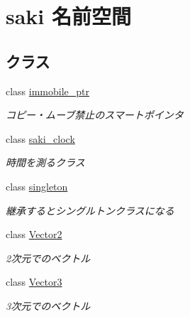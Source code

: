 \hypertarget{namespacesaki}{}\section{saki 名前空間}
\label{namespacesaki}
\subsection*{クラス}
\begin{DoxyCompactItemize}
\item 
class \mbox{\hyperlink{classsaki_1_1immobile__ptr}{immobile\+\_\+ptr}}
\begin{DoxyCompactList}\small\item\em コピー・ムーブ禁止のスマートポインタ \end{DoxyCompactList}\item 
class \mbox{\hyperlink{classsaki_1_1saki__clock}{saki\+\_\+clock}}
\begin{DoxyCompactList}\small\item\em 時間を測るクラス \end{DoxyCompactList}\item 
class \mbox{\hyperlink{classsaki_1_1singleton}{singleton}}
\begin{DoxyCompactList}\small\item\em 継承するとシングルトンクラスになる \end{DoxyCompactList}\item 
class \mbox{\hyperlink{classsaki_1_1_vector2}{Vector2}}
\begin{DoxyCompactList}\small\item\em 2次元でのベクトル \end{DoxyCompactList}\item 
class \mbox{\hyperlink{classsaki_1_1_vector3}{Vector3}}
\begin{DoxyCompactList}\small\item\em 3次元でのベクトル \end{DoxyCompactList}\end{DoxyCompactItemize}
